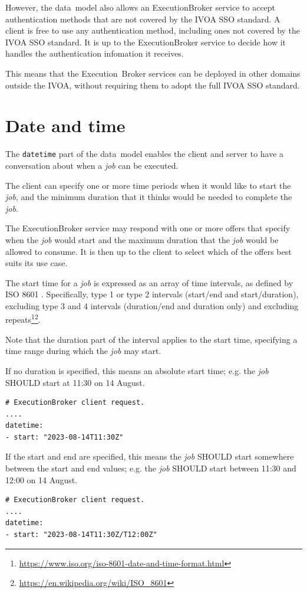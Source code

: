 \documentclass[11pt,a4paper]{ivoa}
\newcommand{\datamodel} {data~model}
\newcommand{\ivoa} {IVOA}
\newcommand{\execbrokerclass} {ExecutionBroker}
\newcommand{\executionbroker} {Execution~Broker}
\newcommand{\codeword}[1] {\texttt{#1}}
\newcommand{\footurl}[1] {\footnote{\url{#1}}}
\newcommand{\job} {\textit{job}}
\begin{document}
However, the \datamodel{} also allows an \execbrokerclass{} service to accept authentication
methods that are not covered by the \ivoa{} SSO standard.
A client is free to use any authentication method, including ones not covered by the
\ivoa{} SSO standard. It is up to the \execbrokerclass{} service to decide how it
handles the authentication infomation it receives.

This means that the \executionbroker{} services can be deployed in other domains outside the \ivoa{},
without requiring them to adopt the full \ivoa{} SSO standard.

\section{Date and time}
\label{date-time}

The \codeword{datetime} part of the \datamodel{} enables the client and server to have a
conversation about when a \job{} can be executed.

The client can specify one or more time periods when it would like to start the \job{},
and the minimum duration that it thinks would be needed to complete the \job{}.

The \execbrokerclass{} service may respond with one or more offers that specify when the \job{}
would start and the maximum duration that the \job{} would be allowed to consume.
It is then up to the client to select which of the offers best suits its use case.

The start time for a \job{} is expressed as an array of time intervals, as defined by
ISO 8601 \citep{std:iso8601}.
Specifically, type 1 or type 2 intervals (start/end and start/duration), excluding type 3 and 4 intervals
(duration/end and duration only) and excluding
repeats\footurl{https://www.iso.org/iso-8601-date-and-time-format.html}\footurl{https://en.wikipedia.org/wiki/ISO_8601}.

Note that the duration part of the interval applies to the start time, specifying a
time range during which the \job{} may start.

If no duration is specified, this means an absolute start time;
e.g. the \job{} SHOULD start at 11:30 on 14 August.
\begin{lstlisting}[]
# ExecutionBroker client request.
....
datetime:
- start: "2023-08-14T11:30Z"
\end{lstlisting}

If the start and end are specified, this means the \job{} SHOULD start somewhere between
the start and end values;
e.g. the \job{} SHOULD start between 11:30 and 12:00 on 14 August.
\begin{lstlisting}[]
# ExecutionBroker client request.
....
datetime:
- start: "2023-08-14T11:30Z/T12:00Z"
\end{lstlisting}
\end{document}
